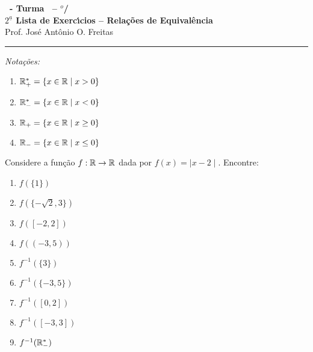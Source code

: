 \documentclass[12pt]{exam}
\begin{document}
\begin{center}
{\Large\bf \disciplina\ - Turma \turma\ -- \semestre$^{o}$/\ano} \\ \vspace{9pt} {\large\bf
  $2^{\underline{a}}$ Lista de Exerc{\'\i}cios -- Rela{\c c}{\~o}es de Equival{\^e}ncia}\\ \vspace{9pt} Prof. Jos{\'e} Ant{\^o}nio O. Freitas
\end{center}
\hrule

\vspace{.6cm}

\begin{center}
	\textit{Notações:}
\end{center}
\begin{multicols}{2}
	\begin{enumerate}[label={\roman*})]
		\item $\mathbb{R}^*_+ = \{x \in \mathbb{R} \mid x > 0\}$
		\item $\mathbb{R}^*_- = \{x \in \mathbb{R} \mid x < 0\}$
		\item $\mathbb{R}_+ = \{x \in \mathbb{R} \mid x \ge 0\}$
		\item $\mathbb{R}_- = \{x \in \mathbb{R} \mid x \le 0\}$
	\end{enumerate}
\end{multicols}

\vspace{.6cm}

\questao Considere a função $f : \mathbb{R} \to \mathbb{R}$ dada por $f(x) = \mid x - 2\mid$. Encontre:
\begin{multicols}{3}
	\begin{enumerate}[label={\alph*})]
		\item $f(\{1\})$
		\item $f(\{-\sqrt{2}, 3\})$
		\item $f([-2,2])$
		\item $f((-3,5))$
		\item $f^{-1}(\{3\})$
		\item $f^{-1}(\{-3,5\})$
		\item $f^{-1}([0,2])$
		\item $f^{-1}([-3,3])$
		\item $f^{-1}(\mathbb{R}^*_-)$
	\end{enumerate}
\end{multicols}

\vspace{.3cm}
\end{document}
